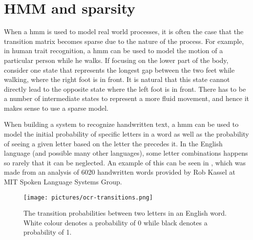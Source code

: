 \section{HMM and sparsity}
When a \gls{hmm} is used to model real world processes, it is often the case that the transition matrix becomes sparse due to the nature of the process.
For example, in human trait recognition, a \gls{hmm} can be used to model the motion of a particular person while he walks.
If focusing on the lower part of the body, consider one state that represents the longest gap between the two feet while walking, where the right foot is in front. It is natural that this state cannot directly lead to the opposite state where the left foot is in front. There has to be a number of intermediate states to represent a more fluid movement, and hence it makes sense to use a sparse model.

When building a system to recognize handwritten text, a \gls{hmm} can be used to model the initial probability of specific letters in a word as well as the probability of seeing a given letter based on the letter the precedes it.
In the English language (and possible many other languages), some letter combinations happens so rarely that it can be neglected.
An example of this can be seen in , which was made from an analysis of 6020 handwritten words provided by Rob Kassel at MIT Spoken Language Systems Group.

\begin{figure}
\texttt{[image: pictures/ocr-transitions.png]}
\label{ocr-transitions}
\caption{The transition probabilities between two letters in an English word. White colour denotes a probability of 0 while black denotes a probability of 1.}
\end{figure}
